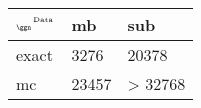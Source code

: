\begin{tabular}{lll}
    \toprule
    $_{\text{\tiny{\ggn}}}$$^{\text{\tiny{Data}}}$ & mb & sub \\
    \midrule
    exact & 3276
              & 20378 \\
    mc   & 23457
              & > 32768 \\
    \bottomrule
\end{tabular}